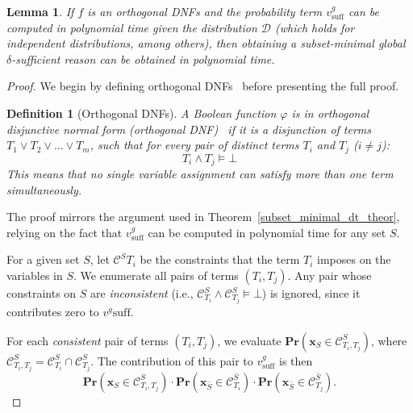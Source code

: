 \documentclass{article}
\newtheorem{lemma}{Lemma}
\newtheorem{definition}{Definition}
\newcommand{\x}{\textbf{x}}
\begin{document}
\begin{lemma}
If $f$ is an orthogonal DNFs and the probability term $v^{g}_{\text{suff}}$ can be computed in polynomial time given the distribution $\mathcal{D}$ 
(which holds for independent distributions, among others),
then obtaining a subset-minimal \emph{global} $ \delta $-sufficient reason can be obtained in \emph{polynomial time}.
\end{lemma}
\begin{proof}
We begin by defining orthogonal DNFs~\citep{crama2011boolean} before presenting the full proof.
%
\begin{definition}[Orthogonal DNFs]
A Boolean function $\varphi$ is in \emph{orthogonal disjunctive normal form} (orthogonal DNF)~\citep{crama2011boolean}
if it is a disjunction of terms $T_1 \lor T_2 \lor \dots \lor T_m$, such that for every pair of distinct terms $T_i$ and $T_j$ ($i \neq j$):
\[
T_i \land T_j \models \bot
\]
This means that no single variable assignment can satisfy more than one term simultaneously.
\end{definition}
%
The proof mirrors the argument used in Theorem~\ref{subset_minimal_dt_theor}, relying on the fact that $v^{g}_{\text{suff}}$ can be computed in polynomial time for any set $S$.

For a given set $S$, let $\mathcal{C}^{S}{T_i}$ be the constraints that the term $T_i$ imposes on the variables in $S$. We enumerate all pairs of terms $(T_i, T_j)$. Any pair whose constraints on $S$ are \emph{inconsistent}
(i.e., $\mathcal{C}^{S}_{T_i} \land \mathcal{C}^{S}_{T_j} \models \bot$) is ignored, since it contributes zero to $v^{g}{\text{suff}}$.


%
%

For each \emph{consistent} pair of terms $(T_i, T_j)$, we evaluate
$\mathbf{Pr}(\x_{S} \in \mathcal{C}^{S}_{T_i, T_j})$, where
$\mathcal{C}^{S}_{T_i, T_j} = \mathcal{C}^{S}_{T_i} \cap \mathcal{C}^{S}_{T_j}$.
The contribution of this pair to $v^{g}_{\text{suff}}$ is then
\[
\mathbf{Pr}(\x_{S} \in \mathcal{C}^{S}_{T_i, T_j}) \cdot \mathbf{Pr}(\x_{\bar{S}} \in \mathcal{C}^{\bar{S}}_{T_i}) \cdot \mathbf{Pr}(\x_{\bar{S}} \in \mathcal{C}^{\bar{S}}_{T_j}).
\]


\end{proof}
\end{document}
